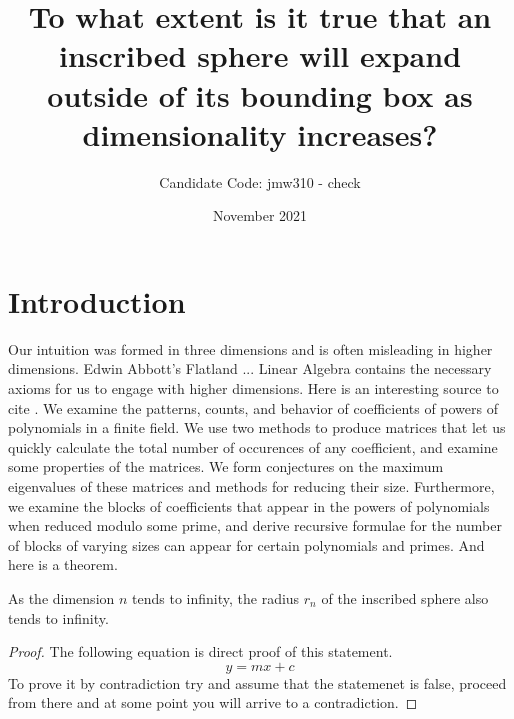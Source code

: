 \title{To what extent is it true that an inscribed sphere will expand outside of its bounding box as dimensionality increases?}
\author{Candidate Code: jmw310 - check}
\date{November 2021}



\section{Introduction}
Our intuition was formed in three dimensions and is often misleading in higher dimensions. Edwin Abbott's Flatland ... Linear Algebra contains the necessary axioms for us to engage with higher dimensions. Here is an interesting source to cite \cite{Cipra_1993}.
\researchquestion{}
    We examine the patterns, counts, and behavior of coefficients of
powers of polynomials in a finite field. We use two methods to produce
matrices that let us quickly calculate the total number of occurences
of any coefficient, and examine some properties of the matrices. We
form conjectures on the maximum eigenvalues of these matrices and
methods for reducing their size. Furthermore, we examine the blocks
of coefficients that appear in the powers of polynomials when reduced
modulo some prime, and derive recursive formulae for the number of
blocks of varying sizes can appear for certain polynomials and primes. And here is a theorem.

\begin{theorem}
As the dimension $n$ tends to infinity, the radius $r_n$ of the inscribed sphere also tends to infinity.
\end{theorem}


\begin{proof}
The following equation is direct proof of this statement.
\begin{equation}
y=mx+c
\end{equation}
To prove it by contradiction try and assume that the statemenet is false,
proceed from there and at some point you will arrive to a contradiction. 
\end{proof}




